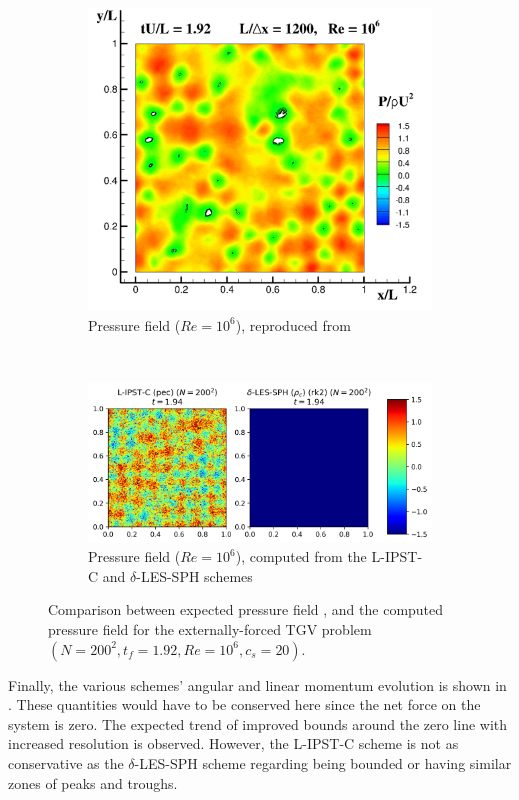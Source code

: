 \begin{figure}[htbp!]
\centering
\begin{subfigure}{10cm}
\centering\includegraphics[width=10cm]{Code-Figures/ext-force-tgv/colag_p_t_1.92.png}
\caption{Pressure field ($Re = 10^6$), reproduced from \cite{Antuono_Marrone_Di_Mascio_Colagrossi_2021}}
\end{subfigure}
\\ \vspace{1cm}
\begin{subfigure}{14cm}
\centering\includegraphics[width=14cm]{Code-Figures/ext-force-tgv/p_t_1.92.png}
\caption{Pressure field ($Re = 10^6$), computed from the L-IPST-C and $\delta$-LES-SPH schemes}
\end{subfigure}
\caption{Comparison between expected pressure field \parencite{Antuono_Marrone_Di_Mascio_Colagrossi_2021}, and the computed pressure field for the externally-forced TGV problem $(N=200^2, t_f=1.92, Re=10^6, c_s=20)$.}
\label{fig:tgv-forced-colag-p}
\end{figure}


Finally, the various schemes' angular and linear momentum evolution is shown in . These quantities would have to be conserved here since the net force on the system is zero. The expected trend of improved bounds around the zero line with increased resolution is observed.
However, the L-IPST-C scheme is not as conservative as the $\delta$-LES-SPH scheme regarding being bounded or having similar zones of peaks and troughs.

